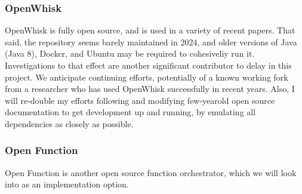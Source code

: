 \subsubsection{OpenWhisk}
OpenWhisk is fully open source, and is used in a variety of recent papers. That said, the repository seems barely maintained in 2024, and older versions of Java (Java 8), Docker, and Ubuntu may be required to cohesiveliy run it.
Investigations to that effect are another significant contributor to delay in this project.
We anticipate continuing efforts, potentially of a known working fork from a researcher who has used OpenWhisk successfully in recent years.
Also, I will re-double my efforts following and modifying few-yearold open source documentation to get development up and running, by emulating all dependencies as closely as possible.

\subsubsection{Open Function}
Open Function is another open source function orchestrator, which we will look into as an implementation option.

